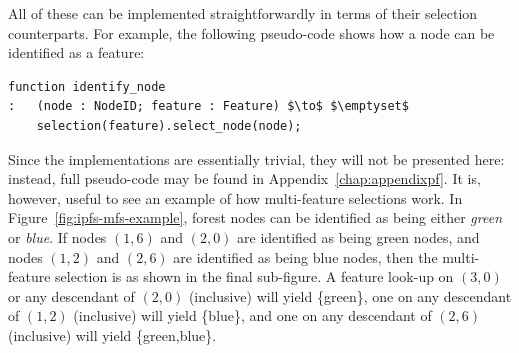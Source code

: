 \newpage

\noindent All of these can be implemented straightforwardly in terms of their selection counterparts. For example, the following pseudo-code shows how a node can be identified as a feature:

\begin{lstlisting}[style=Default]
function identify_node
:	(node : NodeID; feature : Feature) $\to$ $\emptyset$
	selection(feature).select_node(node);
\end{lstlisting}

\noindent Since the implementations are essentially trivial, they will not be presented here: instead, full pseudo-code may be found in Appendix~\ref{chap:appendixpf}. It is, however, useful to see an example of how multi-feature selections work. In Figure~\ref{fig:ipfs-mfs-example}, forest nodes can be identified as being either \emph{green} or \emph{blue}. If nodes $(1,6)$ and $(2,0)$ are identified as being green nodes, and nodes $(1,2)$ and $(2,6)$ are identified as being blue nodes, then the multi-feature selection is as shown in the final sub-figure. A feature look-up on $(3,0)$ or any descendant of $(2,0)$ (inclusive) will yield \{green\}, one on any descendant of $(1,2)$ (inclusive) will yield \{blue\}, and one on any descendant of $(2,6)$ (inclusive) will yield \{green,blue\}.

